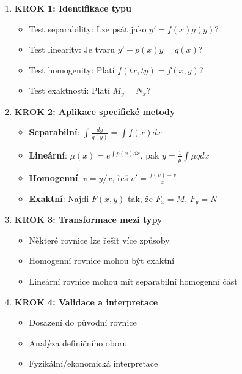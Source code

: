 \vspace{0.8\baselineskip}

\begin{method}
\label{met:univerzalni-algoritmus-level1}
\begin{enumerate}
\item \textbf{KROK 1: Identifikace typu}
\begin{itemize}
\item Test separability: Lze psát jako $y' = f(x)g(y)$?
\item Test linearity: Je tvaru $y' + p(x)y = q(x)$?
\item Test homogenity: Platí $f(tx, ty) = f(x, y)$?
\item Test exaktnosti: Platí $M_y = N_x$?
\end{itemize}

\item \textbf{KROK 2: Aplikace specifické metody}
\begin{itemize}
\item \textbf{Separabilní}: $\int \frac{dy}{g(y)} = \int f(x) dx$
\item \textbf{Lineární}: $\mu(x) = e^{\int p(x)dx}$, pak $y = \frac{1}{\mu}\int \mu q dx$
\item \textbf{Homogenní}: $v = y/x$, řeš $v' = \frac{f(v)-v}{x}$
\item \textbf{Exaktní}: Najdi $F(x,y)$ tak, že $F_x = M$, $F_y = N$
\end{itemize}

\item \textbf{KROK 3: Transformace mezi typy}
\begin{itemize}
\item Některé rovnice lze řešit více způsoby
\item Homogenní rovnice mohou být exaktní
\item Lineární rovnice mohou mít separabilní homogenní část
\end{itemize}

\item \textbf{KROK 4: Validace a interpretace}
\begin{itemize}
\item Dosazení do původní rovnice
\item Analýza definičního oboru
\item Fyzikální/ekonomická interpretace
\end{itemize}
\end{enumerate}
\end{method}

